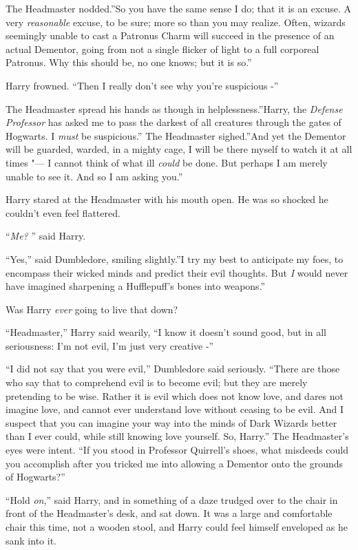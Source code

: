 The Headmaster nodded.''So you have the same sense I do; that it is an
excuse. A very \emph{reasonable} excuse, to be sure; more so than you
may realize. Often, wizards seemingly unable to cast a Patronus Charm
will succeed in the presence of an actual Dementor, going from not a
single flicker of light to a full corporeal Patronus. Why this should
be, no one knows; but it is so.''

Harry frowned. ``Then I really don't see why you're suspicious -''

The Headmaster spread his hands as though in helplessness.''Harry, the
\emph{Defense Professor} has asked me to pass the darkest of all
creatures through the gates of Hogwarts. I \emph{must} be suspicious.''
The Headmaster sighed.''And yet the Dementor will be guarded, warded, in
a mighty cage, I will be there myself to watch it at all times "--- I
cannot think of what ill \emph{could} be done. But perhaps I am merely
unable to see it. And so I am asking you.''

Harry stared at the Headmaster with his mouth open. He was so shocked he
couldn't even feel flattered.

``\emph{Me?} '' said Harry.

``Yes,'' said Dumbledore, smiling slightly.''I try my best to anticipate
my foes, to encompass their wicked minds and predict their evil
thoughts. But \emph{I} would never have imagined sharpening a
Hufflepuff's bones into weapons.''

Was Harry \emph{ever} going to live that down?

``Headmaster,'' Harry said wearily, ``I know it doesn't sound good, but
in all seriousness: I'm not evil, I'm just very creative -''

``I did not say that you were evil,'' Dumbledore said seriously. ``There
are those who say that to comprehend evil is to become evil; but they
are merely pretending to be wise. Rather it is evil which does not know
love, and dares not imagine love, and cannot ever understand love
without ceasing to be evil. And I suspect that you can imagine your way
into the minds of Dark Wizards better than I ever could, while still
knowing love yourself. So, Harry.'' The Headmaster's eyes were intent.
``If you stood in Professor Quirrell's shoes, what misdeeds could you
accomplish after you tricked me into allowing a Dementor onto the
grounds of Hogwarts?''

``Hold \emph{on},'' said Harry, and in something of a daze trudged over
to the chair in front of the Headmaster's desk, and sat down. It was a
large and comfortable chair this time, not a wooden stool, and Harry
could feel himself enveloped as he sank into it.


